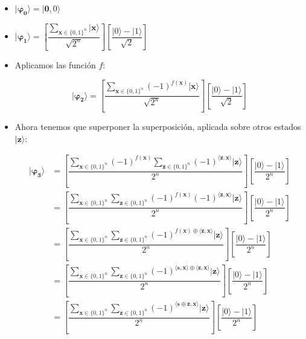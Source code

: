  \begin{itemize}
     \item $\mathbf{|\varphi_{0}\rangle} = |\mathbf{0},0\rangle$

    \vspace{5pt}

    \item  $\mathbf{|\varphi_{1}\rangle} = \left[ \dfrac{\sum_{\mathbf{x} \in \{0,1\}^{n}}|\mathbf{x}\rangle}{\sqrt{2^{n}}}\right] \left[ \dfrac{|0\rangle - |1\rangle}{\sqrt{2}}\right]$

    \vspace{5pt}

    \item Aplicamos las función $f$:
    
    \begin{equation} \label{eq:BV:phi2}
    \mathbf{|\varphi_{2}\rangle} =\left[ \dfrac{\sum_{\mathbf{x} \in \{0,1\}^{n}}(-1)^{f(\mathbf{x})}|\mathbf{x}\rangle}{\sqrt{2^{n}}}\right] \left[ \dfrac{|0\rangle - |1\rangle}{\sqrt{2}}\right]\end{equation}

    \vspace{5pt}

    \item Ahora tenemos que superponer la superposición, aplicada sobre otros estados $|\mathbf{z}\rangle$:

    \begin{equation}\label{eq:BV:phi3}
        \begin{split}\mathbf{|\varphi_{3}\rangle} &= \left[ \dfrac{\sum_{\mathbf{x} \in \{0,1\}^{n}}(-1)^{f(\mathbf{x})}\sum_{\mathbf{z} \in \{0,1\}^{n}}(-1)^{\langle\mathbf{z},\mathbf{x}\rangle}|\mathbf{z}\rangle}{2^{n}}\right] \left[ \dfrac{|0\rangle - |1\rangle}{2^{n}}\right] \\ &= \left[ \dfrac{\sum_{\mathbf{x} \in \{0,1\}^{n}}\sum_{\mathbf{z} \in \{0,1\}^{n}}(-1)^{f(\mathbf{x})}(-1)^{\langle\mathbf{z},\mathbf{x}\rangle}|\mathbf{z}\rangle}{2^{n}}\right] \left[ \dfrac{|0\rangle - |1\rangle}{2^{n}}\right] \\ &= \left[ \dfrac{\sum_{\mathbf{x} \in \{0,1\}^{n}}\sum_{\mathbf{z} \in \{0,1\}^{n}}(-1)^{f(\mathbf{x})\oplus\langle\mathbf{z},\mathbf{x}\rangle}|\mathbf{z}\rangle}{2^{n}}\right] \left[ \dfrac{|0\rangle - |1\rangle}{2^{n}}\right] \\  &= \left[ \dfrac{\sum_{\mathbf{x} \in \{0,1\}^{n}}\sum_{\mathbf{z} \in \{0,1\}^{n}}(-1)^{\langle\mathbf{s},\mathbf{x}\rangle\oplus\langle\mathbf{z},\mathbf{x}\rangle}|\mathbf{z}\rangle}{2^{n}}\right] \left[ \dfrac{|0\rangle - |1\rangle}{2^{n}}\right] \\ &= \left[ \dfrac{\sum_{\mathbf{x} \in \{0,1\}^{n}}\sum_{\mathbf{z} \in \{0,1\}^{n}}(-1)^{\langle\mathbf{s}\oplus \mathbf{z},\mathbf{x}\rangle}|\mathbf{z}\rangle}{2^{n}}\right] \left[ \dfrac{|0\rangle - |1\rangle}{2^{n}}\right] \\
        \end{split}
    \end{equation}
 \end{itemize}

